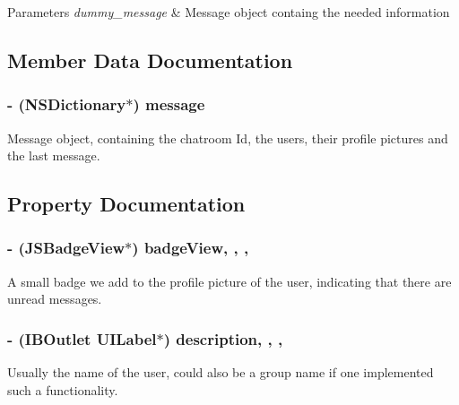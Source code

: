 \begin{DoxyParams}{Parameters}
{\em dummy\+\_\+message} & Message object containg the needed information \\
\hline
\end{DoxyParams}


\subsection{Member Data Documentation}
\hypertarget{interface_e_s_message_cell_a232fa8c6450078d057e6da54fe61e2e9}{}
\subsubsection[{message}]{\setlength{\rightskip}{0pt plus 5cm}-\/ (N\+S\+Dictionary$\ast$) message\hspace{0.3cm}{\ttfamily [protected]}}\label{interface_e_s_message_cell_a232fa8c6450078d057e6da54fe61e2e9}
Message object, containing the chatroom Id, the users, their profile pictures and the last message. 

\subsection{Property Documentation}
\hypertarget{interface_e_s_message_cell_a77d8c4d9b7600dd0ba5b62bffe8ce597}{}
\subsubsection[{badge\+View}]{\setlength{\rightskip}{0pt plus 5cm}-\/ (J\+S\+Badge\+View$\ast$) badge\+View\hspace{0.3cm}{\ttfamily [read]}, {\ttfamily [write]}, {\ttfamily [nonatomic]}, {\ttfamily [strong]}}\label{interface_e_s_message_cell_a77d8c4d9b7600dd0ba5b62bffe8ce597}
A small badge we add to the profile picture of the user, indicating that there are unread messages. \hypertarget{interface_e_s_message_cell_a232f87059fc5fbb886a38d8fa39a7a57}{}
\subsubsection[{description}]{\setlength{\rightskip}{0pt plus 5cm}-\/ (I\+B\+Outlet U\+I\+Label$\ast$) description\hspace{0.3cm}{\ttfamily [read]}, {\ttfamily [write]}, {\ttfamily [nonatomic]}, {\ttfamily [strong]}}\label{interface_e_s_message_cell_a232f87059fc5fbb886a38d8fa39a7a57}
Usually the name of the user, could also be a group name if one implemented such a functionality. \hypertarget{interface_e_s_message_cell_a28056ba2c5cbb8ff51a5057ae3f5f437}{}
